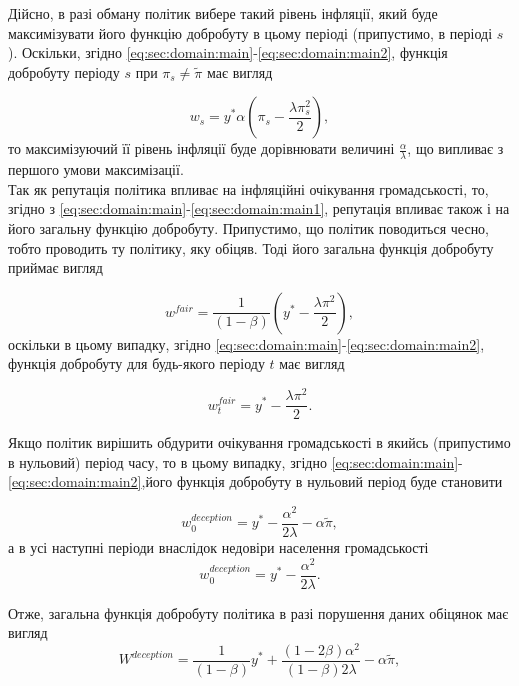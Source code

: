 Дійсно, в разі обману політик вибере такий рівень інфляції, який буде максимізувати його функцію добробуту в цьому періоді (припустимо, в періоді $ s $). Оскільки, згідно \eqref{eq:sec:domain:main}-\eqref{eq:sec:domain:main2}, функція добробуту періоду $s$ при $\pi_s\ne\tilde{\pi}$ має вигляд

\begin{equation}
	\label{eq:sec:domain:main3}
	w_s=y^*\alpha\left(\pi_s - \frac{\lambda\pi^2_s}{2} \right),
\end{equation}
то максимізуючий її рівень інфляції буде дорівнювати величині $\frac{\alpha}{\lambda}$, що випливає з першого умови максимізації.\\

Так як репутація політика впливає на інфляційні очікування громадськості, то, згідно з  \eqref{eq:sec:domain:main}-\eqref{eq:sec:domain:main1}, репутація впливає також і на його загальну функцію добробуту. Припустимо, що політик поводиться чесно, тобто проводить ту політику, яку обіцяв. Тоді його загальна функція добробуту приймає вигляд

\begin{equation}
	w^{fair} = \frac{1}{(1-\beta)} \left( y^*-\frac{\lambda\pi^2}{2} \right),
\end{equation}
оскільки в цьому випадку, згідно \eqref{eq:sec:domain:main}-\eqref{eq:sec:domain:main2}, функція добробуту для будь-якого періоду $t$ має вигляд

\begin{equation}
w^{fair}_t = y^*-\frac{\lambda\pi^2}{2}.
\end{equation}

Якщо політик вирішить обдурити очікування громадськості в якийсь (припустимо в нульовий) період часу, то в цьому випадку, згідно  \eqref{eq:sec:domain:main}-\eqref{eq:sec:domain:main2},його функція добробуту в нульовий період буде становити

\begin{equation}
w^{deception}_0 = y^*-\frac{\alpha^2}{2\lambda}-\alpha\tilde{\pi},
\end{equation}
а в усі наступні періоди внаслідок недовіри населення громадськості
\begin{equation}
w^{deception}_0 = y^*-\frac{\alpha^2}{2\lambda}.
\end{equation}

Отже, загальна функція добробуту політика в разі порушення даних обіцянок має вигляд
\begin{equation}
W^{deception} = \frac{1}{(1-\beta)}y^*+\frac{(1-2\beta)\alpha^2}{(1-\beta)2\lambda}-\alpha\tilde{\pi},
\end{equation}

